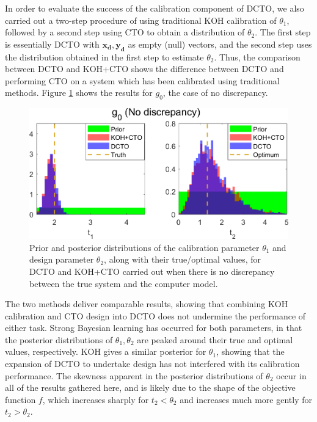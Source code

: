 \documentclass[12pt]{article}
\begin{document}
%
In order to evaluate the success of the calibration component of DCTO, we also carried out a two-step procedure of using traditional KOH calibration of $\theta_1$, followed by a second step using CTO to obtain a distribution of $\theta_2$. 
%
The first step is essentially DCTO with $\mathbf{x_d},\mathbf{y_d}$ as empty (null) vectors, and the second step uses the distribution obtained in the first step to estimate $\theta_2$.
%
Thus, the comparison between DCTO and KOH+CTO shows the difference between DCTO and performing CTO on a system which has been calibrated using traditional methods.
%
%
Figure \ref{fig:no_discrep_results} shows the results for $g_0$, the case of no discrepancy.
%
\begin{figure}
\centering
\includegraphics[scale=0.85]{FIG_KOHCTO_DCTO_comp_discrep0_results}
\captionsetup{width=.85\linewidth}
\caption{Prior and posterior distributions of the calibration parameter $\theta_1$ and design parameter $\theta_2$, along with their true/optimal values, for DCTO and KOH+CTO carried out when there is no discrepancy between the true system and the computer model.}
\label{fig:no_discrep_results}
\end{figure}
%
The two methods deliver comparable results, showing that combining KOH calibration and CTO design into DCTO does not undermine the performance of either task.
%
Strong Bayesian learning has occurred for both parameters, in that the posterior distributions of $\theta_1,\theta_2$ are peaked around their true and optimal values, respectively.
%
KOH gives a similar posterior for $\theta_1$, showing that the expansion of DCTO to undertake design has not interfered with its calibration performance.
%
The skewness apparent in the posterior distributions of $\theta_2$ occur in all of the results gathered here, and is likely due to the shape of the objective function $f$, which increases sharply for $t_2<\theta_2$ and increases much more gently for $t_2>\theta_2$.
%
\end{document}
